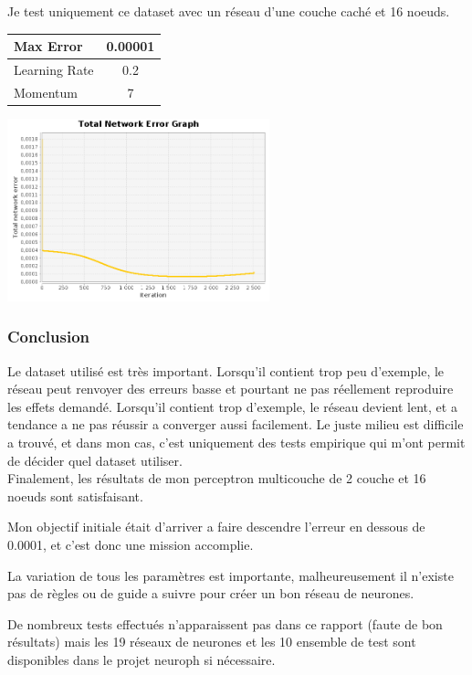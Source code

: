 \documentclass[10pt]{report}
\begin{document}
Je test uniquement ce dataset avec un réseau d'une couche caché et 16 noeuds.

\begin{center}
\begin{tabular}{|l|c|}
	\hline
	Max Error & 0.00001 \\
	\hline
	Learning Rate & 0.2 \\
	\hline
	Momentum & 7 \\
	\hline
\end{tabular}
\includegraphics[height=200px]{img/SQUARE_16_2001.png}\\
\end{center}

\subsubsection{Conclusion}
Le dataset utilisé est très important. Lorsqu'il contient trop peu d'exemple, le réseau peut renvoyer des erreurs basse et pourtant ne pas réellement reproduire les effets demandé. Lorsqu'il contient trop d'exemple, le réseau devient lent, et a tendance a ne pas réussir a converger aussi facilement. Le juste milieu est difficile a trouvé, et dans mon cas, c'est uniquement des tests empirique qui m'ont permit de décider quel dataset utiliser.\\

Finalement, les résultats de mon perceptron multicouche de 2 couche et 16 noeuds sont satisfaisant. 

Mon objectif initiale était d'arriver a faire descendre l'erreur en dessous de 0.0001, et c'est donc une mission accomplie.

La variation de tous les paramètres est importante, malheureusement il n'existe pas de règles ou de guide a suivre pour créer un bon réseau de neurones.

De nombreux tests effectués n'apparaissent pas dans ce rapport (faute de bon résultats) mais les 19 réseaux de neurones et les 10 ensemble de test sont disponibles dans le projet neuroph si nécessaire.
\end{document}
